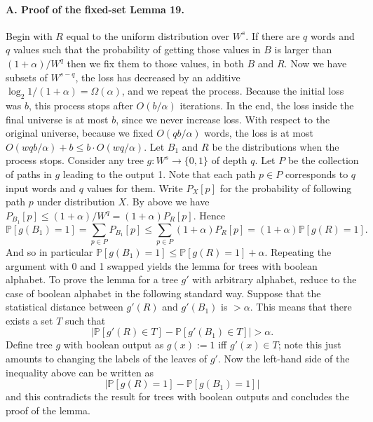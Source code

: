 \paragraph{A. Proof of the fixed-set Lemma 19.}
Begin with $R$ equal to the uniform distribution over $W^s$. If there are $q$ words and $q$ values such that the probability of getting those values in $B$ is larger than $(1+\alpha)/W^q$ then we fix them to those values, in both $B$ and $R$. Now we have subsets of $W^{s-q}$, the loss has decreased by an additive $\log_2 1/(1+\alpha)=\Omega(\alpha)$, and we repeat the process.
Because the initial loss was $b$, this process stops after $O(b/\alpha)$ iterations. In the end, the loss inside the final universe is at most $b$, since we never increase loss. With respect to the original universe, because we fixed $O(qb/\alpha)$ words, the loss is at most $O(wqb/\alpha)+b\leq b\cdot O(wq/\alpha)$.
Let $B_1$ and $R$ be the distributions when the process stops. Consider any tree $g:W^s\to\{0,1\}$ of depth $q$. Let $P$ be the collection of paths in $g$ leading to the output 1. Note that each path $p\in P$ corresponds to $q$ input words and $q$ values for them. Write $P_X[p]$ for the probability of following path $p$ under distribution $X$. By above we have $P_{B_1}[p]\leq(1+\alpha)/W^q=(1+\alpha)P_R[p]$.
Hence
\[\mathbb P[g(B_1)=1]=\sum_{p\in P}P_{B_1}[p]\leq\sum_{p\in P}(1+\alpha)P_R[p]=(1+\alpha)\mathbb P[g(R)=1].\]
And so in particular $\mathbb P[g(B_1)=1]\leq\mathbb P[g(R)=1]+\alpha$.
Repeating the argument with 0 and 1 swapped yields the lemma for trees with boolean alphabet. To prove the lemma for a tree $g'$ with arbitrary alphabet, reduce to the case of boolean alphabet in the following standard way. Suppose that the statistical distance between $g'(R)$ and $g'(B_1)$ is $>\alpha$. This means that there exists a set $T$ such that
\[|\mathbb P[g'(R)\in T]-\mathbb P[g'(B_1)\in T]|>\alpha.\]
Define tree $g$ with boolean output as $g(x):=1$ iff $g'(x)\in T$; note this just amounts to changing the labels of the leaves of $g'$. Now the left-hand side of the inequality above can be written as
\[|\mathbb P[g(R)=1]-\mathbb P[g(B_1)=1]|\]
and this contradicts the result for trees with boolean outputs and concludes the proof of the lemma.
